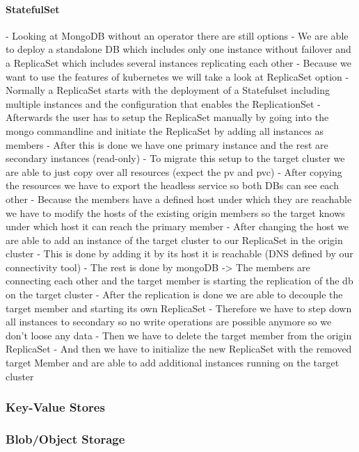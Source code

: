 \paragraph{StatefulSet}
%
- Looking at MongoDB without an operator there are still options
- We are able to deploy a standalone DB which includes only one instance without failover and a ReplicaSet which includes several instances replicating each other
- Because we want to use the features of kubernetes we will take a look at ReplicaSet option
- Normally a ReplicaSet starts with the deployment of a Statefulset including multiple instances and the configuration that enables the ReplicationSet
- Afterwards the user has to setup the ReplicaSet manually by going into the mongo commandline and initiate the ReplicaSet by adding all instances as members
- After this is done we have one primary instance and the rest are secondary instances (read-only)
- To migrate this setup to the target cluster we are able to just copy over all resources (expect the pv and pvc)
- After copying the resources we have to export the headless service so both DBs can see each other
- Because the members have a defined host under which they are reachable we have to modify the hosts of the existing origin members so the target knows under which host it can reach the primary member
- After changing the host we are able to add an instance of the target cluster to our ReplicaSet in the origin cluster
- This is done by adding it by its host it is reachable (DNS defined by our connectivity tool)
- The rest is done by mongoDB -> The members are connecting each other and the target member is starting the replication of the db on the target cluster
- After the replication is done we are able to decouple the target member and starting its own ReplicaSet
- Therefore we have to step down all instances to secondary so no write operations are possible anymore so we don't loose any data
- Then we have to delete the target member from the origin ReplicaSet
- And then we have to initialize the new ReplicaSet with the removed target Member and are able to add additional instances running on the target cluster
%
\subsubsection{Key-Value Stores}
%
\subsubsection{Blob/Object Storage}
%
